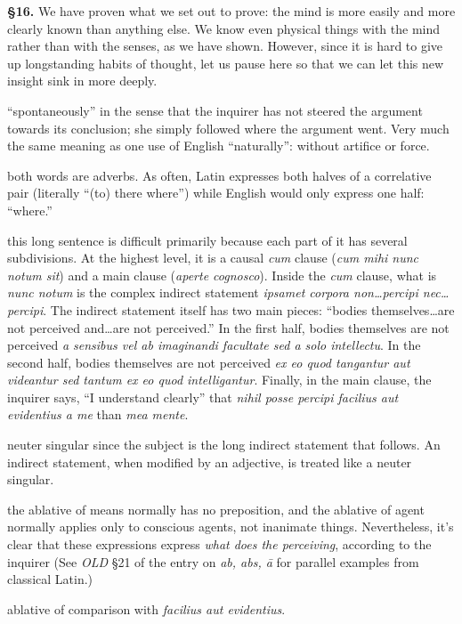 \textbf{§16.} We have proven what we set out to prove: the mind is more easily and more clearly known than anything else. We know even physical things with the mind rather than with the senses, as we have shown. However, since it is hard to give up longstanding habits of thought, let us pause here so that we can let this new insight sink in more deeply.

 ``spontaneously'' in the sense that the inquirer has not steered the argument towards its conclusion; she simply followed where the argument went. Very much the same meaning as one use of English ``naturally'': without artifice or force.

 both words are adverbs. As often, Latin expresses both halves of a correlative pair (literally ``(to) there where'') while English would only express one half: ``where.''

 this long sentence is difficult primarily because each part of it has several subdivisions. At the highest level, it is a causal \textit{cum} clause (\textit{cum mihi nunc notum sit}) and a main clause (\textit{aperte cognosco}). Inside the \textit{cum} clause, what is \textit{nunc notum} is the complex indirect statement \textit{ipsamet corpora non\dots percipi nec\dots percipi}. The indirect statement itself has two main pieces: ``bodies themselves\dots are not perceived and\dots are not perceived.'' In the first half, bodies themselves are not perceived \textit{a sensibus vel ab imaginandi facultate sed a solo intellectu}. In the second half, bodies themselves are not perceived \textit{ex eo quod tangantur aut videantur sed tantum ex eo quod intelligantur}. Finally, in the main clause, the inquirer says, ``I understand clearly'' that \textit{nihil posse percipi facilius aut evidentius a me} than \textit{mea mente}.

 neuter singular since the subject is the long indirect statement that follows. An indirect statement, when modified by an adjective, is treated like a neuter singular.

 the ablative of means normally has no preposition, and the ablative of agent normally applies only to conscious agents, not inanimate things. Nevertheless, it's clear that these expressions express \textit{what does the perceiving}, according to the inquirer (See \textit{OLD} §21 of the entry on \textit{ab, abs, ā} for parallel examples from classical Latin.)

 ablative of comparison with \textit{facilius aut evidentius}.

